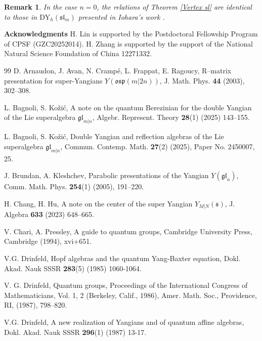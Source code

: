 \documentclass[a4paper,12pt]{article}
\newtheorem{rema}[theo]{Remark}
\numberwithin{equation}{section}
\begin{document}
\begin{rema}
In the case $n=0$, the relations of Theorem \ref{Vertex sl} are identical to those in $\mathrm{DY}_{h}(\mathfrak{sl}_{m})$ presented in Iohara's work \cite{I96}.
\end{rema}
\noindent\textbf{Acknowledgments} H. Lin is supported by the Postdoctoral Fellowship Program of CPSF (GZC20252014). H. Zhang is supported by the support of the National Natural Science Foundation of China 12271332.




\begin{thebibliography}{99}
\vskip5pt
 D. Arnaudon, J. Avan, N. Crampé, L. Frappat, E. Ragoucy, R--matrix presentation for super-Yangians $Y(\mathfrak{osp}(m|2n))$, J. Math. Phys. 
\textbf{44} (2003), 302--308.

L. Bagnoli, S. Ko\v zi\'c, A note on the quantum Berezinian for the double Yangian of the Lie superalgebra $\mathfrak{gl}_{m|n}$, Algebr. Represent. Theory \textbf{28}(1) (2025) 143--155.

L. Bagnoli, S. Ko\v zi\'c, Double Yangian and reflection algebras of the Lie
superalgebra {$\mathfrak{gl}_{m|n}$}, Commun. Contemp. Math. \textbf{27}(2) (2025), Paper No. 2450007, 25.

J. Brundan, A. Kleshchev, Parabolic presentations of the Yangian $Y(\mathfrak{gl}_n)$, Comm. Math. Phys. \textbf{254}(1) (2005), 191--220.

H. Chang, H. Hu, A note on the center of the super Yangian {$Y_{M|N}(\mathfrak{ s})$}, J. Algebra \textbf{633} (2023) 648--665.

V. Chari, A. Pressley, A guide to quantum groups, Cambridge University Press, Cambridge (1994), xvi+651.

V.G. Drinfeld, Hopf algebras and the quantum Yang-Baxter equation, Dokl. Akad. Nauk SSSR \textbf{283}(5) (1985) 1060-1064.

V. G. Drinfeld, Quantum groups, Proceedings of the International Congress of Mathematicians, Vol. 1, 2 (Berkeley, Calif., 1986), Amer. Math. Soc., Providence, RI, (1987), 798--820.

V.G. Drinfeld, A new realization of Yangians and of quantum affine algebras, Dokl. Akad. Nauk SSSR \textbf{296}(1) (1987) 13-17.


\end{thebibliography}
\end{document}
